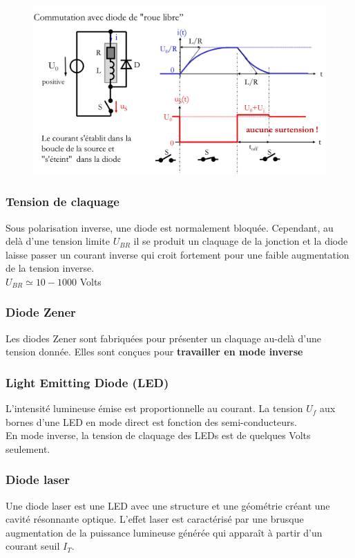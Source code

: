 \documentclass[../main.tex]{subfiles}
\begin{document}
\begin{figure}[hbt!]
    \centering
    \includegraphics[width=\textwidth]{IMAGES/elec/IMG_0129.jpeg}
\end{figure}

\subsubsection{Tension de claquage}
Sous polarisation inverse, une diode est normalement bloquée. Cependant, au delà d'une tension limite $U_{BR}$ il se produit un claquage de la jonction et la diode laisse passer un courant inverse qui croit fortement pour une faible augmentation de la tension inverse.\\
$U_{BR} \simeq 10-1000$ Volts\\

\subsubsection{Diode Zener}
Les diodes Zener sont fabriquées pour présenter un claquage au-delà d'une tension donnée. Elles sont conçues pour \textbf{travailler en mode inverse} 

\subsubsection{Light Emitting Diode (LED)}
L'intensité lumineuse émise est proportionnelle au courant. La tension $U_f$ aux bornes d'une LED en mode direct est fonction des semi-conducteurs.\\
En mode inverse, la tension de claquage des LEDs est de quelques Volts seulement.\\

\subsubsection{Diode laser}
Une diode laser est une LED avec une structure et une géométrie créant une cavité résonnante optique. L'effet laser est caractérisé par une brusque augmentation de la puissance lumineuse générée qui apparaît à partir d'un courant seuil $I_T$.\\
\end{document}
